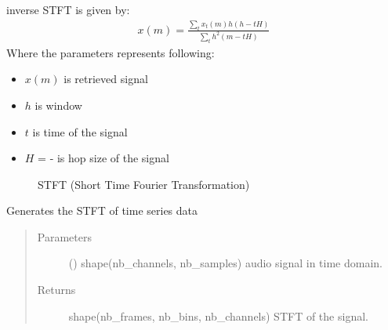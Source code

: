 \documentclass[letterpaper,10pt,english]{sphinxmanual}
\begin{document}
\begin{fulllineitems}
\begin{fulllineitems}
inverse STFT is given by:
\begin{equation*}
\begin{split}x(m) = \frac{ \sum_{t}x_{t}(m)h(h-tH) }{ \sum_{t} h^{2}(m-tH) }\end{split}
\end{equation*}
Where the parameters represents following:
\begin{itemize}
\item {} 
\(x(m)\) is retrieved signal

\item {} 
\(h\) is window

\item {} 
\(t\) is time of the signal

\item {} 
\(H\) =  -  is hop size of the signal

\end{itemize}



\begin{description}
\item[{{\hyperref[\detokenize{docs/source/preprocess:preprocess.preprocess_tools.STFT.stft}]{}}}] \leavevmode
STFT (Short Time Fourier Transformation)

\end{description}



\end{fulllineitems}


\begin{fulllineitems}
\label{\detokenize{docs/source/preprocess:preprocess.preprocess_tools.STFT.stft}}
Generates the STFT of time series data
\begin{quote}\begin{description}
\item[{Parameters}] \leavevmode
{} () \textendash{} shape(nb\_channels, nb\_samples)
audio signal in time domain.

\item[{Returns}] \leavevmode
{} \textendash{} shape(nb\_frames, nb\_bins, nb\_channels)
STFT of the signal.


\end{description}
\end{quote}
\end{fulllineitems}
\end{fulllineitems}
\end{document}
